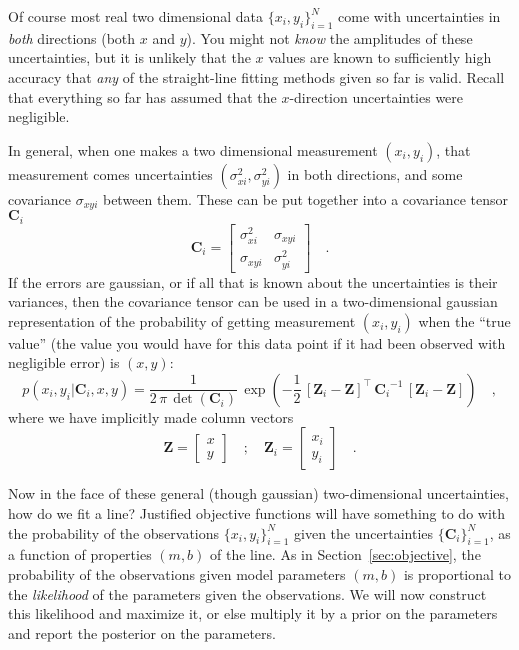 \documentclass[12pt]{article}
\newcommand{\sectionname}{Section}
\newcommand{\mmatrix}[1]{\boldsymbol{#1}}
\newcommand{\inverse}[1]{{#1}^{-1}}
\newcommand{\transpose}[1]{{#1}^{\scriptscriptstyle \top}}
\newcommand{\mC}{\mmatrix{C}}
\newcommand{\mZ}{\mmatrix{Z}}
\newcommand{\setofall}[3]{\{{#1}\}_{{#2}}^{{#3}}}
\newcommand{\allxy}{\setofall{x_i,y_i}{i=1}{N}}
\newcommand{\allC}{\setofall{\mC_i}{i=1}{N}}
\begin{document}
Of course most real two dimensional data $\allxy$ come with
uncertainties in \emph{both} directions (both $x$ and $y$).  You might
not \emph{know} the amplitudes of these uncertainties, but it is
unlikely that the $x$ values are known to sufficiently high accuracy
that \emph{any} of the straight-line fitting methods given so far is
valid.  Recall that everything so far has assumed that the
$x$-direction uncertainties were negligible.

In general, when one makes a two dimensional measurement $(x_i,y_i)$,
that measurement comes uncertainties $(\sigma_{xi}^2,\sigma_{yi}^2)$
in both directions, and some covariance $\sigma_{xyi}$ between them.
These can be put together into a covariance tensor $\mC_i$
\begin{equation}
\mC_i = \left[\begin{array}{cc}
\sigma_{xi}^2 & \sigma_{xyi} \\ \sigma_{xyi} & \sigma_{yi}^2
\end{array}\right] \quad .
\end{equation}
If the errors are gaussian, or if all that is known about the
uncertainties is their variances, then the covariance tensor can be
used in a two-dimensional gaussian representation of the probability
of getting measurement $(x_i,y_i)$ when the ``true value'' (the value
you would have for this data point if it had been observed with
negligible error) is $(x,y)$:
\begin{equation}
p(x_i,y_i|\mC_i,x,y) = \frac{1}{2\,\pi\,\det(\mC_i)}
  \,\exp\left(-\frac{1}{2}\,\transpose{\left[\mZ_i - \mZ\right]}
  \,\inverse{\mC_i}\,\left[\mZ_i - \mZ\right]\right) \quad ,
\end{equation}
where we have implicitly made column vectors
\begin{equation}\label{eq:mZ}
\mZ = \left[\begin{array}{c} x \\ y \end{array}\right] \quad ; \quad
\mZ_i = \left[\begin{array}{c} x_i \\ y_i \end{array}\right] \quad .
\end{equation}

Now in the face of these general (though gaussian) two-dimensional
uncertainties, how do we fit a line?  Justified objective functions
will have something to do with the probability of the observations
$\allxy$ given the uncertainties $\allC$, as a function of properties
$(m,b)$ of the line.  As in \sectionname~\ref{sec:objective}, the
probability of the observations given model parameters $(m,b)$ is
proportional to the \emph{likelihood} of the parameters given the
observations.  We will now construct this likelihood and maximize it,
or else multiply it by a prior on the parameters and report the
posterior on the parameters.
\end{document}
